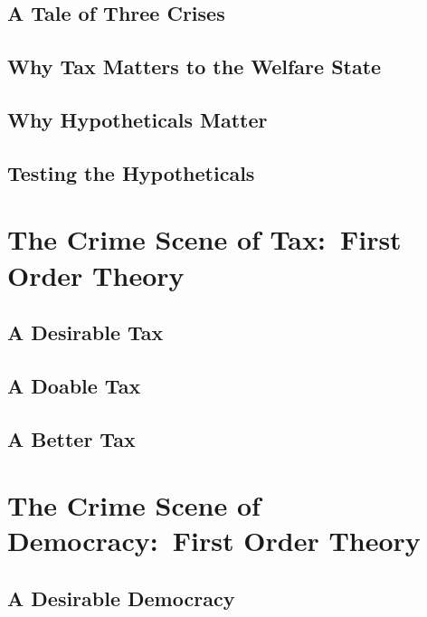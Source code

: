 \documentclass[11pt,a4paper,openright,oneside,titlepage]{book}
\begin{document}
	\chapter[Three Crises]{A Tale of Three Crises}
		\label{chap:3-crises}
		
	\chapter[Tax Matters]{Why Tax Matters to the Welfare State}
		\label{chap:tax-matters}
		
	\chapter[Hypotheticals Matter]{Why Hypotheticals Matter}
		\label{chap:hypotheticals-matter}
		
	\chapter{Testing the Hypotheticals}
		\label{chap:testing-hypotheticals}
		
\part[The Crime Scene of Tax]{The Crime Scene of Tax:\ First Order Theory}
	\label{part:tax}
	\chapter[Desirable Tax]{A Desirable Tax}
		\label{chap:desirable-tax}
		
	\chapter[Doable Tax]{A Doable Tax}
		\label{chap:doable-tax}
		
	\chapter[Better Tax]{A Better Tax}
		\label{chap:better-tax}
		
\part[The Crime Scene of Democracy]{The Crime Scene of Democracy:\ First Order Theory}
	\label{part:democracy}
	\chapter[Desirable Democracy]{A Desirable Democracy}
		\label{chap:desirable-democracy}
		
\end{document}
